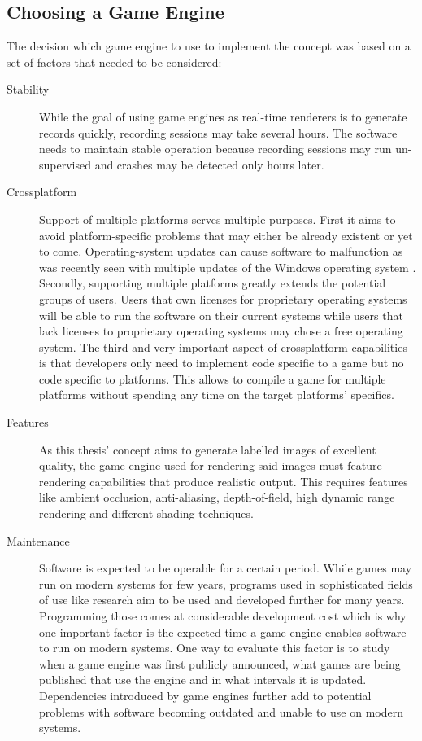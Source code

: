 \subsection{Choosing a Game Engine}
The decision which game engine to use to implement the concept was based on a set of factors that needed to be considered:
\begin{description}
\item [Stability] While the goal of using game engines as real-time renderers is to generate records quickly, recording sessions may take several hours. The software needs to maintain stable operation because recording sessions may run un-supervised and crashes may be detected only hours later.
\item [Crossplatform] Support of multiple platforms serves multiple purposes. First it aims to avoid platform-specific problems that may either be already existent or yet to come. Operating-system updates can cause software to malfunction as was recently seen with multiple updates of the Windows operating system \cite{heiseWindowsUpdate}. Secondly, supporting multiple platforms greatly extends the potential groups of users. Users that own licenses for proprietary operating systems will be able to run the software on their current systems while users that lack licenses to proprietary operating systems may chose a free operating system. The third and very important aspect of crossplatform-capabilities is that developers only need to implement code specific to a game but no code specific to platforms. This allows to compile a game for multiple platforms without spending any time on the target platforms' specifics.
\item [Features] As this thesis' concept aims to generate labelled images of excellent quality, the game engine used for rendering said images must feature rendering capabilities that produce realistic output. This requires features like ambient occlusion, anti-aliasing, depth-of-field, high dynamic range rendering and different shading-techniques.
\item [Maintenance] Software is expected to be operable for a certain period. While games may run on modern systems for few years, programs used in sophisticated fields of use like research aim to be used and developed further for many years. Programming those comes at considerable development cost which is why one important factor is the expected time a game engine enables software to run on modern systems. One way to evaluate this factor is to study when a game engine was first publicly announced, what games are being published that use the engine and in what intervals it is updated. Dependencies introduced by game engines further add to potential problems with software becoming outdated and unable to use on modern systems. 

\end{description}
